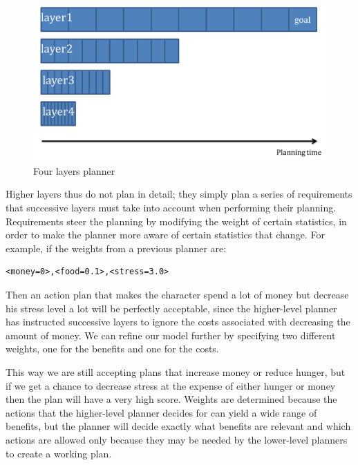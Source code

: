 \begin{figure}
\begin{center}
\includegraphics[scale=0.3]{Pics/layers.png}
\end{center}
\caption{Four layers planner}
\label{fig:layers}
\end{figure}  

Higher layers thus do not plan in detail; they simply plan a series of requirements that successive layers must take into account when performing their planning. Requirements steer the planning by modifying the weight of certain statistics, in order to make the planner more aware of certain statistics that change. For example, if the weights from a previous planner are:

\begin{lstlisting}
<money=0>,<food=0.1>,<stress=3.0>
\end{lstlisting}

Then an action plan that makes the character spend a lot of money but decrease his stress level a lot will be perfectly acceptable, since the higher-level planner has instructed successive layers to ignore the costs associated with decreasing the amount of money. We can refine our model further by specifying two different weights, one for the benefits and one for the costs.

This way we are still accepting plans that increase money or reduce hunger, but if we get a chance to decrease stress at the expense of either hunger or money then the plan will have a very high score. Weights are determined because the actions that the higher-level planner decides for can yield a wide range of benefits, but the planner will decide exactly what benefits are relevant and which actions are allowed only because they may be needed by the lower-level planners to create a working plan.

